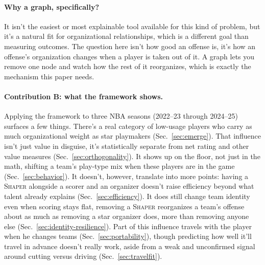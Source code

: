 \documentclass[11pt]{article}
\begin{document}
\paragraph{Why a graph, specifically?}
It isn't the easiest or most explainable tool available for this kind of problem, but it's a
natural fit for organizational relationships, which is a different goal than measuring
outcomes. The question here isn't how good an offense is, it's how an offense's organization
changes when a player is taken out of it. A graph lets you remove one node and watch how the
rest of it reorganizes, which is exactly the mechanism this paper needs.

\paragraph{Contribution B: what the framework shows.}
Applying the framework to three NBA seasons (2022--23 through 2024--25) surfaces a few things.
There's a real category of low-usage players who carry as much organizational weight as star
playmakers (Sec.~\ref{sec:emerge}). That influence isn't just value in disguise, it's
statistically separate from net rating and other value measures
(Sec.~\ref{sec:orthogonality}). It shows up on the floor, not just in the math, shifting a
team's play-type mix when these players are in the game (Sec.~\ref{sec:behavior}). It doesn't,
however, translate into more points: having a \textsc{Shaper} alongside a scorer and an
organizer doesn't raise efficiency beyond what talent already explains
(Sec.~\ref{sec:efficiency}). It does still change team identity even when scoring stays flat,
removing a \textsc{Shaper} reorganizes a team's offense about as much as removing a star
organizer does, more than removing anyone else (Sec.~\ref{sec:identity-resilience}). Part of
this influence travels with the player when he changes teams (Sec.~\ref{sec:portability}),
though predicting how well it'll travel in advance doesn't really work, aside from a weak and
unconfirmed signal around cutting versus driving (Sec.~\ref{sec:travelfit}).
\end{document}
